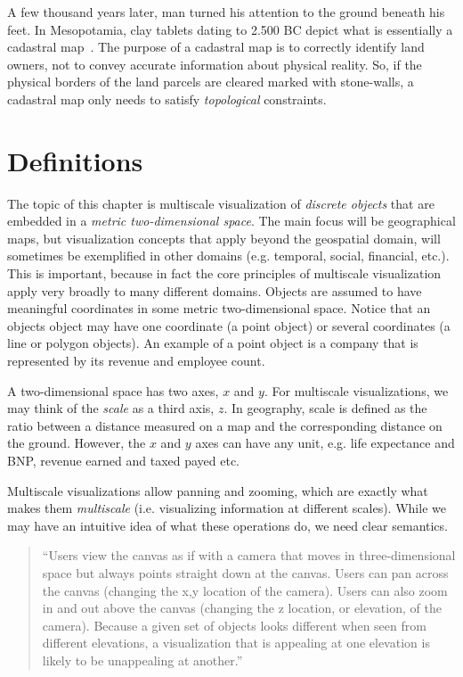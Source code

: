 \documentclass[11pt, oneside]{report}   	%
\begin{document}
A few thousand years later, man turned his attention to the ground beneath his feet. In Mesopotamia, clay tablets dating to 2.500 BC depict what is essentially a cadastral map~\cite{harley1987cartography}. The purpose of a cadastral map is to correctly identify land owners, not to convey accurate information about physical reality. So, if the physical borders of the land parcels are cleared marked with stone-walls, a cadastral map only needs to satisfy \emph{topological} constraints. 

\section{Definitions}

The topic of this chapter is multiscale visualization of \emph{discrete objects} that are embedded in a \emph{metric two-dimensional space}. The main focus will be geographical maps, but visualization concepts that apply beyond the geospatial domain, will sometimes be exemplified in other domains (e.g. temporal, social, financial, etc.). This is important, because in fact the core principles of multiscale visualization apply very broadly to many different domains. Objects are assumed to have meaningful coordinates in some metric two-dimensional space. Notice that an objects object may have one coordinate (a point object) or several coordinates (a line or polygon objects). An example of a point object is a company that is represented by its revenue and employee count.

A two-dimensional space has two axes, $x$ and $y$. For multiscale visualizations, we may think of the \emph{scale} as a third axis, $z$. In geography, scale is defined as the ratio between a distance measured on a map and the corresponding distance on the ground. However, the $x$ and $y$ axes can have any unit, e.g. life expectance and BNP, revenue earned and taxed payed etc.

Multiscale visualizations allow panning and zooming, which are exactly what makes them \emph{multiscale} (i.e. visualizing information at different scales).  While we may have an intuitive idea of what these operations do, we need clear semantics.

\begin{quote}
``Users view the canvas as if with a camera that moves in three-dimensional space but always points straight down at the canvas. Users can pan across the canvas (changing the x,y location of the camera). Users can also zoom in and out above the canvas (changing the z location, or elevation, of the camera). Because a given set of objects looks different when seen from different elevations, a visualization that is appealing at one elevation is likely to be unappealing at another.''~\cite{woodruff1998constant}
\end{quote}
\end{document}
